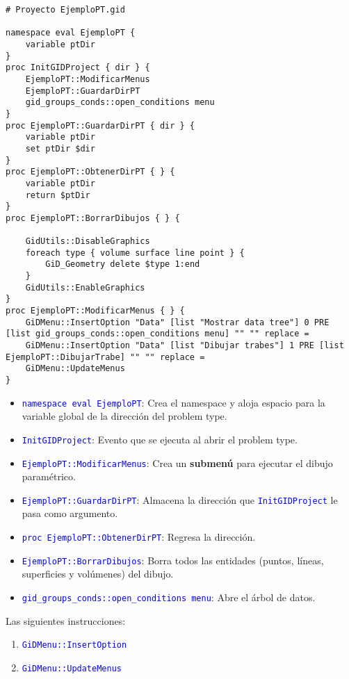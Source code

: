 \documentclass[10pt, a4paper, twocolumn]{article}
\begin{document}
\lstset{language=tcl} 
\begin{lstlisting}[caption={Código para inicializar el proyecto y crear el menú.}]
# Proyecto EjemploPT.gid

namespace eval EjemploPT {
	variable ptDir
}
proc InitGIDProject { dir } {
	EjemploPT::ModificarMenus
	EjemploPT::GuardarDirPT
	gid_groups_conds::open_conditions menu
}
proc EjemploPT::GuardarDirPT { dir } {
	variable ptDir
	set ptDir $dir
}
proc EjemploPT::ObtenerDirPT { } {
	variable ptDir
	return $ptDir
}
proc EjemploPT::BorrarDibujos { } {
	
	GidUtils::DisableGraphics
	foreach type { volume surface line point } {
		GiD_Geometry delete $type 1:end
	} 
	GidUtils::EnableGraphics
}
proc EjemploPT::ModificarMenus { } {
	GiDMenu::InsertOption "Data" [list "Mostrar data tree"] 0 PRE [list gid_groups_conds::open_conditions menu] "" "" replace =
	GiDMenu::InsertOption "Data" [list "Dibujar trabes"] 1 PRE [list EjemploPT::DibujarTrabe] "" "" replace =
    GiDMenu::UpdateMenus
}
\end{lstlisting}

\begin{itemize}
	\item \textcolor{blue}{\texttt{namespace eval EjemploPT}}: Crea el namespace y aloja espacio para la variable global de la dirección del problem type.
	\item \textcolor{blue}{\texttt{InitGIDProject}}: Evento que se ejecuta al abrir el problem type.
	\item \textcolor{blue}{\texttt{EjemploPT::ModificarMenus}}: Crea un \textbf{submenú} para ejecutar el dibujo paramétrico.
	\item \textcolor{blue}{\texttt{EjemploPT::GuardarDirPT}}: Almacena la dirección que \textcolor{blue}{\texttt{InitGIDProject}} le pasa como argumento.
	\item \textcolor{blue}{\texttt{proc EjemploPT::ObtenerDirPT}}: Regresa la dirección.
	\item \textcolor{blue}{\texttt{EjemploPT::BorrarDibujos}}: Borra todos las entidades (puntos, líneas, superficies y volúmenes) del dibujo. 
	\item \textcolor{blue}{\texttt{gid\_groups\_conds::open\_conditions menu}}: Abre el árbol de datos.	
\end{itemize}

Las siguientes instrucciones:
\begin{enumerate}
	\item \textcolor{blue}{\texttt{GiDMenu::InsertOption}}
	\item \textcolor{blue}{\texttt{GiDMenu::UpdateMenus}}
\end{enumerate}
\end{document}
